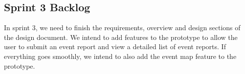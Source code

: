 \subsection{Sprint 3 Backlog}
In sprint 3, we need to finish the requirements, overview and design sections of the design document. We intend to add features to the prototype to allow the user to submit an event report and view a detailed list of event reports. If everything goes smoothly, we intend to also add the event map feature to the prototype.
